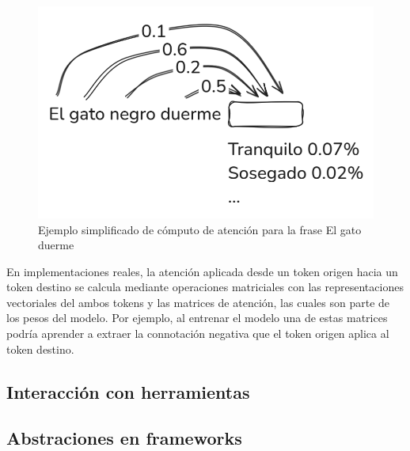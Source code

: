 \begin{figure}
    \centering
    \includegraphics[width=0.65\linewidth]{figures/atencion_poc.png}
    \caption{Ejemplo simplificado de cómputo de atención para la frase \textquotedbl El gato duerme\textquotedbl}
    \label{fig:atencion_gato}
\end{figure}

En implementaciones reales, la atención aplicada desde un token origen hacia un token destino se calcula mediante operaciones matriciales con las representaciones vectoriales del ambos tokens y las matrices de atención, las cuales son parte de los pesos del modelo. Por ejemplo, al entrenar el modelo una de estas matrices podría aprender a extraer la connotación negativa que el token origen aplica al token destino. 

\subsection{Interacción con herramientas}

\subsection{Abstraciones en frameworks}










